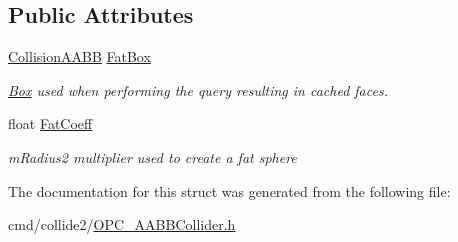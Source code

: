 \subsection*{Public Attributes}
\begin{DoxyCompactItemize}
\item 
\hyperlink{classCollisionAABB}{Collision\+A\+A\+BB} \hyperlink{structAABBCache_a739e3bc835cf651d3040bf615ec63996}{Fat\+Box}\hypertarget{structAABBCache_a739e3bc835cf651d3040bf615ec63996}{}\label{structAABBCache_a739e3bc835cf651d3040bf615ec63996}

\begin{DoxyCompactList}\small\item\em \hyperlink{classBox}{Box} used when performing the query resulting in cached faces. \end{DoxyCompactList}\item 
float \hyperlink{structAABBCache_aa3e8dde6b0472dd391a2884cd0aa9efa}{Fat\+Coeff}\hypertarget{structAABBCache_aa3e8dde6b0472dd391a2884cd0aa9efa}{}\label{structAABBCache_aa3e8dde6b0472dd391a2884cd0aa9efa}

\begin{DoxyCompactList}\small\item\em m\+Radius2 multiplier used to create a fat sphere \end{DoxyCompactList}\end{DoxyCompactItemize}


The documentation for this struct was generated from the following file\+:\begin{DoxyCompactItemize}
\item 
cmd/collide2/\hyperlink{OPC__AABBCollider_8h}{O\+P\+C\+\_\+\+A\+A\+B\+B\+Collider.\+h}\end{DoxyCompactItemize}
